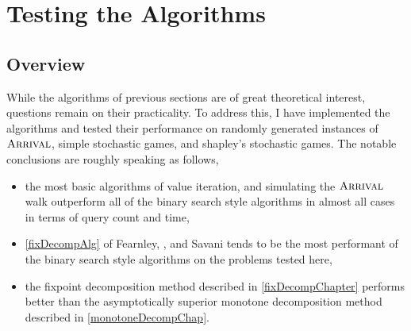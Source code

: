 \chapter{Testing the Algorithms} \label{testingChap}
\newcommand{\code}[1]{\lstinline|#1|}
\section{Overview}
While the algorithms of previous sections are of great theoretical interest,
questions remain on their practicality. To address this,
I have implemented the algorithms and tested their performance on
randomly generated instances of $ \textsc{Arrival} $, simple stochastic games, and
shapley's stochastic games. The notable conclusions are roughly speaking as follows,
\begin{itemize}
  \item the most basic algorithms of value iteration, and simulating the $\textsc{Arrival}$ walk outperform all of the
binary search style algorithms in almost all cases in terms of query count and time,
\item \cref{fixDecompAlg} of Fearnley, \pav, and Savani 
  tends to be the most performant of the binary search style algorithms on the problems tested
  here,
  \item the fixpoint decomposition method described in \cref{fixDecompChapter} performs better than the asymptotically superior
monotone decomposition method described in \cref{monotoneDecompChap}.
\end{itemize}




